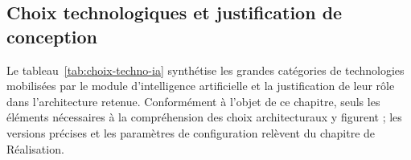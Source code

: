 
\subsection{Choix technologiques et justification de conception}

Le tableau~\ref{tab:choix-techno-ia} synthétise les grandes catégories de technologies mobilisées par le module d'intelligence artificielle et la justification de leur rôle dans l'architecture retenue. Conformément à l'objet de ce chapitre, seuls les éléments nécessaires à la compréhension des choix architecturaux y figurent ; les versions précises et les paramètres de configuration relèvent du chapitre de Réalisation.

